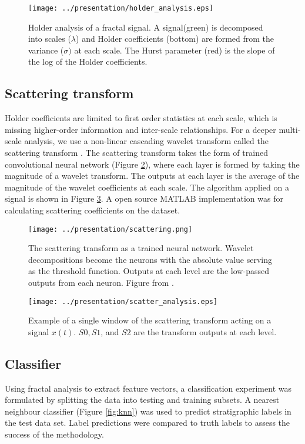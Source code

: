 \documentclass[journal]{IEEEtran}
\begin{document}
 \begin{figure}[!t]
\centering
\texttt{[image: ../presentation/holder\_analysis.eps]}
\caption{Holder analysis of a fractal signal. A signal(green) is decomposed into scales ($\lambda$) and 
Holder coefficients (bottom) are formed from the variance ($\sigma)$ at each scale. The Hurst parameter (red) is
the slope of the log of the Holder coefficients. }
\label{fig:Holder}
\end{figure}


\subsection{Scattering transform}
Holder coefficients are limited to first order statistics at each scale, which is missing higher-order information
and inter-scale relationships. For a deeper multi-scale analysis, we use a non-linear cascading wavelet
transform called the scattering transform \cite{mallat}. The scattering transform takes the form of trained convolutional 
neural network (Figure \ref{fig:scatter}), where each layer is formed by taking the magnitude of a wavelet transform. The outputs
at each layer is the average of the magnitude of the wavelet coefficients at each scale. The algorithm applied on
a signal is shown in Figure \ref{fig:scatter_sig}. A open source MATLAB implementation \cite{Scatnet} was for calculating scattering coefficients
on the dataset.

 \begin{figure}[!t]
\centering
\texttt{[image: ../presentation/scattering.png]}
\caption{The scattering transform as a trained neural network. Wavelet decompositions become the
neurons with the absolute value serving as the threshold function. Outputs at each level are the low-passed outputs from
each neuron. Figure from \cite{mallat}.}
\label{fig:scatter}
\end{figure}

 \begin{figure}[!t]
\centering
\texttt{[image: ../presentation/scatter\_analysis.eps]}
\caption{Example of a single window of the scattering transform acting on a signal $x(t)$. $S0, S1$, and $S2$ are the transform outputs
at each level.}
\label{fig:scatter_sig}
\end{figure}

\subsection{Classifier}
Using fractal analysis to extract feature vectors, a classification experiment was formulated by splitting 
the data into testing and training subsets. A nearest neighbour classifier (Figure \ref{fig:knn}) was used to predict stratigraphic
labels in the test data set. Label predictions were compared to truth labels to assess the success of the methodology.
 
\end{document}
